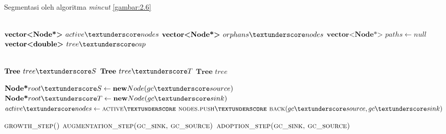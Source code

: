 \begin{algorithm}
    \caption{Segmentasi oleh algoritma \emph{mincut} \ref{gambar:2.6}}          
    \label{algo:mincut_segmentation}                 
    \begin{algorithmic}            %
        \\ 
        \State $\textbf{vector<Node*> }  active\textunderscore nodes$
        \State $\textbf{vector<Node*> }  orphans\textunderscore nodes$
        \State $\textbf{vector<Node*> }  paths \gets null$
        \State $\textbf{vector<double> } tree\textunderscore cap$


        \\ 
        \State $\textbf{Tree }  tree\textunderscore S$
        \State $\textbf{Tree }  tree\textunderscore T$
        \State $\textbf{Tree }  tree$
        

        \State $\textbf{Node*} root\textunderscore S \gets \textbf{new} Node(gc\textunderscore source)$
        \State $\textbf{Node*} root\textunderscore T \gets \textbf{new} Node(gc\textunderscore sink)$
        \State $active\textunderscore nodes \gets \Call{active\textunderscore nodes.push\textunderscore back}{gc\textunderscore source, gc\textunderscore sink}$

                \State $\Call{growth\textunderscore step()}{}$
                    \State $\Call{augmentation\textunderscore step(gc\textunderscore sink, gc\textunderscore source)}{}$
                \EndIf
                \State $\Call{adoption\textunderscore step(gc\textunderscore sink, gc\textunderscore source)}{}$

            \EndWhile
        \EndFunction
    \end{algorithmic}
\end{algorithm}


